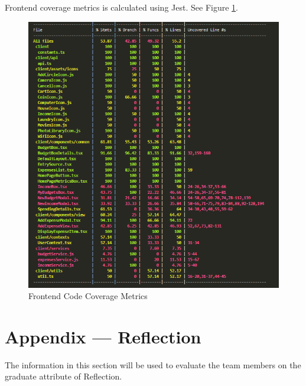 \documentclass[12pt, titlepage]{article}
\begin{document}
\newpage{}

Frontend coverage metrics is calculated using Jest. See Figure \ref{fig:coverage-frontend}.
\begin{figure}[h!]
  \centering
  \includegraphics[width=\linewidth, height=0.85\textheight, keepaspectratio]{./coverage-frontend.png}
  \caption{Frontend Code Coverage Metrics}\label{fig:coverage-frontend}
\end{figure}
\newpage{}

\section*{Appendix --- Reflection}

The information in this section will be used to evaluate the team members on the
graduate attribute of Reflection.


\end{document}
